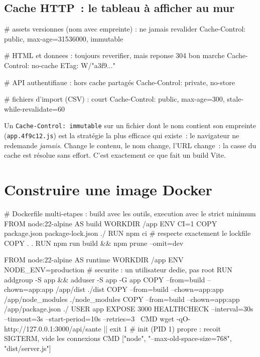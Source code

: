 \documentclass[12pt,a4paper,twoside,openright]{book}
\begin{document}
\subsection{Cache HTTP~: le tableau \`a afficher au mur}

\begin{codeconf}
# assets versionnes (nom avec empreinte) : ne jamais revalider
Cache-Control: public, max-age=31536000, immutable

# HTML et donnees : toujours reverifier, mais reponse 304 bon marche
Cache-Control: no-cache
ETag: W/"a3f9..."

# API authentifiaue : hors cache partag\'es
Cache-Control: private, no-store

# fichiers d'import (CSV) : court
Cache-Control: public, max-age=300, stale-while-revalidate=60
\end{codeconf}

\begin{note}
Un \verb|Cache-Control: immutable| sur un fichier dont le nom contient son empreinte
(\verb|app.4f9c12.js|) est la strat\'egie la plus efficace qui existe~: le navigateur ne redemande
\emph{jamais}. Change le contenu, le nom change, l'URL change~: la casse du cache est r\'esolue
sans effort. C'est exactement ce que fait un build Vite.
\end{note}

\section{Construire une image Docker}

\begin{codeconf}
# Dockerfile multi-etapes : build avec les outils, execution avec le strict minimum
FROM node:22-alpine AS build
WORKDIR /app
ENV CI=1
COPY package.json package-lock.json ./
RUN npm ci                       # respecte exactement le lockfile
COPY . .
RUN npm run build && npm prune --omit=dev

FROM node:22-alpine AS runtime
WORKDIR /app
ENV NODE_ENV=production
# securite : un utilisateur dedie, pas root
RUN addgroup -S app && adduser -S app -G app
COPY --from=build --chown=app:app /app/dist ./dist
COPY --from=build --chown=app:app /app/node_modules ./node_modules
COPY --from=build --chown=app:app /app/package.json ./
USER app
EXPOSE 3000
HEALTHCHECK --interval=30s --timeout=3s --start-period=10s --retries=3 \
  CMD wget -qO- http://127.0.0.1:3000/api/sante || exit 1
# init (PID 1) propre : recoit SIGTERM, vide les connexions
CMD ["node", "--max-old-space-size=768", "dist/server.js"]
\end{codeconf}
\end{document}
